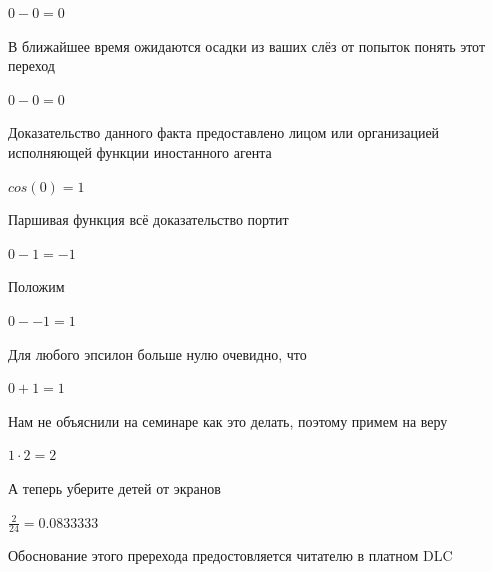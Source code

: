 \documentclass[12pt,a4paper,fleqn]{article}
\begin{document}
\begin{center}
\end{center}
\begin{center}$0-0 = 0$\end{center}
В ближайшее время ожидаются осадки из ваших слёз от попыток понять этот переход

\begin{center}
\end{center}
\begin{center}$0-0 = 0$\end{center}
Доказательство данного факта предоставлено лицом или организацией исполняющей функции иностанного агента

\begin{center}
\end{center}
\begin{center}$cos(0) = 1$\end{center}
Паршивая функция всё доказательство портит\cite{link2}

\begin{center}
\end{center}
\begin{center}$0-1 = -1$\end{center}
Положим

\begin{center}
\end{center}
\begin{center}$0--1 = 1$\end{center}
Для любого эпсилон больше нулю очевидно, что

\begin{center}
\end{center}
\begin{center}$0+1 = 1$\end{center}
Нам не объяснили на семинаре как это делать, поэтому примем на веру

\begin{center}
\end{center}
\begin{center}$1 \cdot 2 = 2$\end{center}
А теперь уберите детей от экранов

\begin{center}
\end{center}
\begin{center}$\frac{2}{24} = 0.0833333$\end{center}
Обоснование этого пререхода предостовляется читателю в платном DLC
\end{document}
